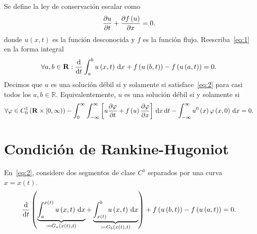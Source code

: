 Se define la ley de conservación escalar como
\begin{equation}\label{eq:1}
	\diffp{u}{t}+
	\diffp{f\left(u\right)}{x}=
	0.
\end{equation}
donde $u\left(x,t\right)$ es la función desconocida y $f$ es la
función flujo.
Reescriba~\eqref{eq:1} en la forma integral
\begin{equation}\label{eq:2}
	\forall a,b\in\mathbf{R}:
	\diff{}{t}
	\int_{a}^{b}
	u\left(x,t\right)
	\dl x+
	f\left(u\left(b,t\right)\right)-
	f\left(u\left(a,t\right)\right)=0.
\end{equation}
Decimos que $u$ es una solución débil si y solamente si satisface~\eqref{eq:2}
para casi todos los $a,b\in\mathbb{R}$.
Equivalentemente, $u$ es una solución débil si y solamente si
\begin{equation*}
	\forall\varphi\in C^{1}_{0}\left(\mathbf{R}\times\left[0,\infty\right)\right)
	-\int_{0}^{\infty}
	\int_{-\infty}^{\infty}
	\left[u\diffp{\varphi}{t}+
		f\left(u\right)\diffp{\varphi}{x}\right]
	\dl x\dl t-
	\int_{-\infty}^{\infty}
	u^{0}\left(x\right)\varphi\left(x,0\right)
	\dl x=0.
\end{equation*}

\section{Condición de Rankine-Hugoniot}

En~\eqref{eq:2}, considere dos segmentos de clase $C^{1}$ separados
por una curva $x=x\left(t\right)$.
\begin{equation*}
	\diff{}{t}
	\left(
	\underbrace{
		\int_{a}^{x\left(t\right)}
		u\left(x,t\right)
		\dl x
	}_{\coloneqq G_{a}\left(x\left(t\right),t\right)}+
	\underbrace{
		\int_{x\left(t\right)}^{b}
		u\left(x,t\right)
		\dl x
	}_{\coloneqq G_{b}\left(x\left(t\right),t\right)}
	\right)+
	f\left(u\left(b, t\right)\right)-
	f\left(u\left(a,t\right)\right)=
	0.
\end{equation*}

